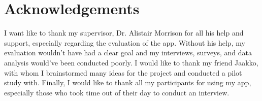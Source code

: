 \documentclass{l4proj}
\begin{document}
\newpage
\chapter*{Acknowledgements}
I want like to thank my supervisor, Dr. Alistair Morrison for all his help and support, especially regarding the evaluation of the app. Without his help, my evaluation wouldn't have had a clear goal and my interviews, surveys, and data analysis would've been conducted poorly. I would like to thank my friend Jaakko, with whom I brainstormed many ideas for the project and conducted a pilot study with. Finally, I would like to thank all my participants for using my app, especially those who took time out of their day to conduct an interview.


\def\consentname {Eerik Saksi} %
\def\consentdate {31 March 2021} %

\educationalconsent


\tableofcontents

%
%
%
%
%
%
%
%
\end{document}
